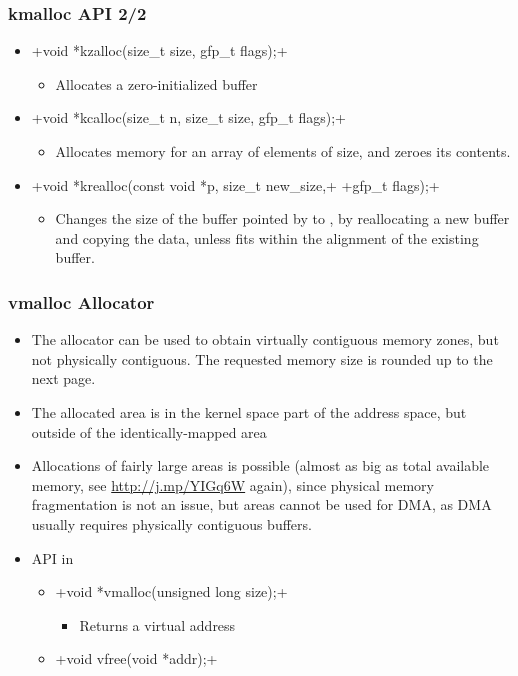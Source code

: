 \begin{frame}[fragile]
  \frametitle{kmalloc API 2/2}
  \begin{itemize}
  \item {}+void *kzalloc(size_t size, gfp_t flags);+
    \begin{itemize}
    \item Allocates a zero-initialized buffer
    \end{itemize}
  \item {}+void *kcalloc(size_t n, size_t size, gfp_t flags);+
    \begin{itemize}
    \item Allocates memory for an array of  elements of
       size, and zeroes its contents.
    \end{itemize}
  \item {}+void *krealloc(const void *p, size_t new_size,+
    +gfp_t flags);+
    \begin{itemize}
    \item Changes the size of the buffer pointed by  to
      , by reallocating a new buffer and copying the
      data, unless  fits within the alignment of
      the existing buffer.
    \end{itemize}
  \end{itemize}
\end{frame}

\begin{frame}[fragile]
  \frametitle{vmalloc Allocator}
  \begin{itemize}
  \item The  allocator can be used to obtain virtually
    contiguous memory zones, but not physically contiguous. The
    requested memory size is rounded up to the next page.
  \item The allocated area is in the kernel space part of the address
    space, but outside of the identically-mapped area
  \item Allocations of fairly large areas is possible (almost as big
    as total available memory, see \url{http://j.mp/YIGq6W} again),
    since physical memory fragmentation is not an issue, but areas
    cannot be used for DMA, as DMA usually requires physically
    contiguous buffers.
  \item API in 
    \begin{itemize}
    \item {}+void *vmalloc(unsigned long size);+
      \begin{itemize}
      \item Returns a virtual address
      \end{itemize}
    \item {}+void vfree(void *addr);+
    \end{itemize}
  \end{itemize}
\end{frame}

